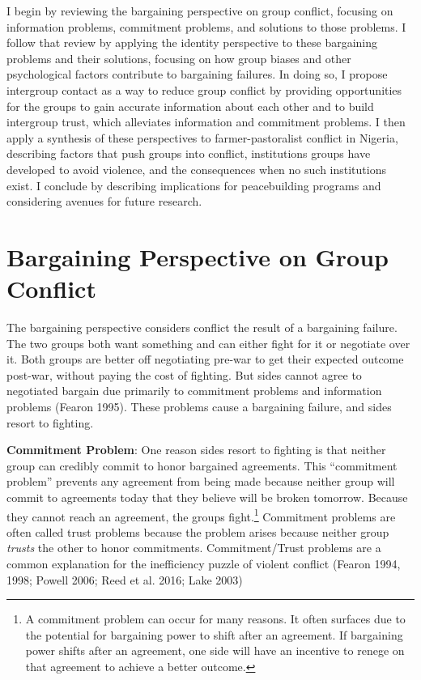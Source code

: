 \documentclass[11pt]{article}
\begin{document}
I begin by reviewing the bargaining perspective on group conflict,
focusing on information problems, commitment problems, and solutions to
those problems. I follow that review by applying the identity
perspective to these bargaining problems and their solutions, focusing
on how group biases and other psychological factors contribute to
bargaining failures. In doing so, I propose intergroup contact as a way
to reduce group conflict by providing opportunities for the groups to
gain accurate information about each other and to build intergroup
trust, which alleviates information and commitment problems. I then
apply a synthesis of these perspectives to farmer-pastoralist conflict
in Nigeria, describing factors that push groups into conflict,
institutions groups have developed to avoid violence, and the
consequences when no such institutions exist. I conclude by describing
implications for peacebuilding programs and considering avenues for
future research.

\hypertarget{bargaining-perspective-on-group-conflict}{%
\section{Bargaining Perspective on Group
Conflict}\label{bargaining-perspective-on-group-conflict}}

The bargaining perspective considers conflict the result of a bargaining
failure. The two groups both want something and can either fight for it
or negotiate over it. Both groups are better off negotiating pre-war to
get their expected outcome post-war, without paying the cost of
fighting. But sides cannot agree to negotiated bargain due primarily to
commitment problems and information problems (Fearon 1995). These
problems cause a bargaining failure, and sides resort to
fighting.\newline

\noindent \textbf{Commitment Problem}: One reason sides resort to
fighting is that neither group can credibly commit to honor bargained
agreements. This ``commitment problem'' prevents any agreement from
being made because neither group will commit to agreements today that
they believe will be broken tomorrow. Because they cannot reach an
agreement, the groups fight.\footnote{A commitment problem can occur for
  many reasons. It often surfaces due to the potential for bargaining
  power to shift after an agreement. If bargaining power shifts after an
  agreement, one side will have an incentive to renege on that agreement
  to achieve a better outcome.} Commitment problems are often called
trust problems because the problem arises because neither group
\emph{trusts} the other to honor commitments. Commitment/Trust problems
are a common explanation for the inefficiency puzzle of violent conflict
(Fearon 1994, 1998; Powell 2006; Reed et al. 2016; Lake 2003)
\end{document}
